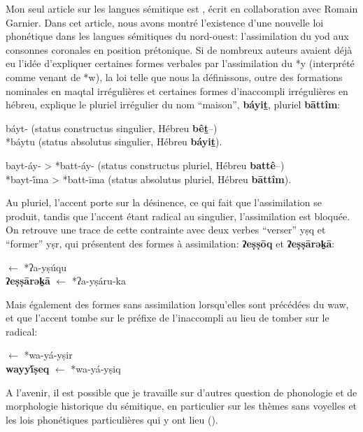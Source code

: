 \documentclass[oldfontcommands,oneside,a4paper,11pt]{memoir}
\newcommand{\ipa}[1]{{\phon\textbf{#1}}}
\begin{document}
Mon seul article sur les langues sémitique est \citet{rg-gj12yod}, écrit en collaboration avec Romain Garnier. Dans cet article, nous avons montré l'existence d'une nouvelle loi phonétique dans les langues sémitiques du nord-ouest: l'assimilation du yod aux consonnes coronales en position prétonique. Si de nombreux auteurs avaient déjà eu l'idée d'expliquer certaines formes verbales par l'assimilation du *y (interprété comme venant de *w), la loi telle que nous la définissons, outre des formations nominales en maqtal irrégulières et certaines formes d'inaccompli irrégulières en hébreu, explique le pluriel irrégulier du nom ``maison'', \ipa{báyiṯ}, pluriel \ipa{bāttîm}:
\begin{exe} 
\ex *báyt-  (status constructus singulier, Hébreu  \ipa{bêṯ}--) \\ \label{bayit.sg}
 *báytu (status absolutus singulier, Hébreu \ipa{báyiṯ}). 
\end{exe}
\begin{exe} 
\ex *bayt-áy- > *batt-áy- (status constructus pluriel, Hébreu  \ipa{battê}--) \\ \label{bayit.pl}
  *bayt-ī́ma > *batt-īma (status absolutus pluriel, Hébreu \ipa{bāttîm}).
\end{exe}
Au pluriel, l'accent porte sur la désinence, ce qui fait que l'assimilation se produit, tandis que l'accent étant radical au singulier, l'assimilation est bloquée. On retrouve une trace de cette contrainte avec deux verbes ``verser'' yṣq et ``former'' yṣr, qui présentent des formes à assimilation: \ipa{ʔeṣṣōq} et \ipa{ʔeṣṣārək̠ā}:
\begin{exe} 
\ex  \ipa{ʔeṣṣōq}   $\leftarrow$ *ʔa-yṣúqu \\
  \ipa{ʔeṣṣārək̠ā} $\leftarrow$ *ʔa-yṣáru-ka \\ 
\end{exe}
Mais également des formes sans assimilation lorsqu'elles sont précédées du waw, et que l'accent tombe sur le préfixe de l'inaccompli au lieu de tomber sur le radical:

\begin{exe} 
\ex \ipa{wayyī́ṣer}  $\leftarrow$ *wa-yá-yṣir \\
  \ipa{wayyī́ṣeq} $\leftarrow$ *wa-yá-yṣiq 
\end{exe}
 
A l'avenir, il est possible que je travaille sur d'autres question de phonologie et de morphologie historique du sémitique, en particulier sur les thèmes sans voyelles et les lois phonétiques particulières qui y ont lieu (\citealt{testen85rn}).
\end{document}
